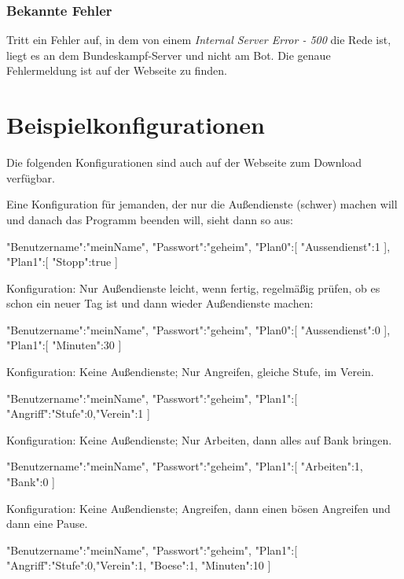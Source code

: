\documentclass{scrartcl}
\begin{document}
\subsubsection{Bekannte Fehler}
Tritt ein Fehler auf, in dem von einem \textit{Internal Server Error - 500} die Rede ist, liegt es an dem Bundeskampf-Server und nicht am Bot. Die genaue Fehlermeldung ist auf der Webseite zu finden.


\section{Beispielkonfigurationen}
\label{example}
Die folgenden Konfigurationen sind auch auf der Webseite zum Download verfügbar.

Eine Konfiguration für jemanden, der nur die Außendienste (schwer) machen will und danach das Programm beenden will, sieht dann so aus:

\begin{code}[language=bash]
"Benutzername":"meinName",
"Passwort":"geheim",
"Plan0":[
	{"Aussendienst":1}
],
"Plan1":[
	{"Stopp":true}
]
\end{code}


Konfiguration: Nur Außendienste leicht, wenn fertig, regelmäßig prüfen, ob es schon ein neuer Tag ist und dann wieder Außendienste machen:

\begin{code}[language=bash]
"Benutzername":"meinName",
"Passwort":"geheim",
"Plan0":[
	{"Aussendienst":0}
],
"Plan1":[
	{"Minuten":30}
]
\end{code}

Konfiguration: Keine Außendienste; Nur Angreifen, gleiche Stufe, im Verein.

\begin{code}[language=bash]
"Benutzername":"meinName",
"Passwort":"geheim",
"Plan1":[
	{"Angriff":{"Stufe":0,"Verein":1}}
]
\end{code}

Konfiguration: Keine Außendienste; Nur Arbeiten, dann alles auf Bank bringen.

\begin{code}[language=bash]
"Benutzername":"meinName",
"Passwort":"geheim",
"Plan1":[
	{"Arbeiten":1},
	{"Bank":0}
]
\end{code}

Konfiguration: Keine Außendienste; Angreifen, dann einen bösen Angreifen und dann eine Pause.

\begin{code}[language=bash]
"Benutzername":"meinName",
"Passwort":"geheim",
"Plan1":[
	{"Angriff":{"Stufe":0,"Verein":1}},
	{"Boese":1},
	{"Minuten":10}
]
\end{code}
\ccbyncsa
\end{document}
